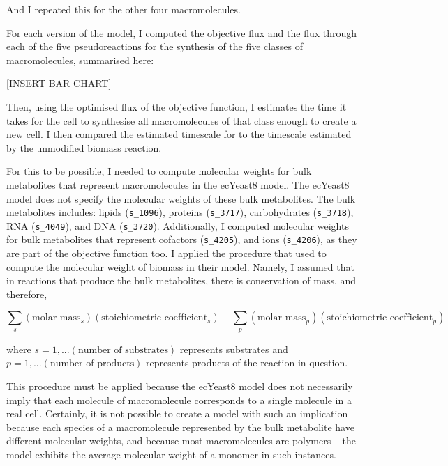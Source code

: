 And I repeated this for the other four macromolecules.

For each version of the model, I computed the objective flux and the flux through each of the five pseudoreactions for the synthesis of the five classes of macromolecules, summarised here:

[INSERT BAR CHART]

Then, using the optimised flux of the objective function, I estimates the time it takes for the cell to synthesise all macromolecules of that class enough to create a new cell.
I then compared the estimated timescale for to the timescale estimated by the unmodified biomass reaction.

For this to be possible, I needed to compute molecular weights for bulk metabolites that represent macromolecules in the ecYeast8 model.
The ecYeast8 model does not specify the molecular weights of these bulk metabolites.
The bulk metabolites includes: lipids (\texttt{s\_1096}), proteins (\texttt{s\_3717}), carbohydrates (\texttt{s\_3718}), RNA (\texttt{s\_4049}), and DNA (\texttt{s\_3720}).
Additionally, I computed molecular weights for bulk metabolites that represent cofactors (\texttt{s\_4205}), and ions (\texttt{s\_4206}), as they are part of the objective function too.
I applied the procedure that \textcite{takhaveevTemporalSegregationBiosynthetic2023} used to compute the molecular weight of biomass in their model.
Namely, I assumed that in reactions that produce the bulk metabolites, there is conservation of mass, and therefore,

\begin{equation}
\label{eq:conservation-of-mass}
    \sum_{s}(\text{molar mass}_{s})(\text{stoichiometric coefficient}_{s}) - \sum_{p}(\text{molar mass}_{p})(\text{stoichiometric coefficient}_{p})
\end{equation}

where $s = 1, ... (\text{number of substrates})$ represents substrates and $p = 1, ... (\text{number of products})$ represents products of the reaction in question.

This procedure must be applied because the ecYeast8 model does not necessarily imply that each molecule of macromolecule corresponds to a single molecule in a real cell.
Certainly, it is not possible to create a model with such an implication because each species of a macromolecule represented by the bulk metabolite have different molecular weights, and because most macromolecules are polymers -- the model exhibits the average molecular weight of a monomer in such instances.


